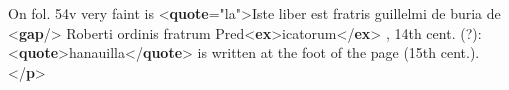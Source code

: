 \begin{shaded}
\hspace*{1em}\hspace*{1em}On fol. 54v very faint is {<\textbf{quote}\hspace*{1em}{xml:lang}="{la}">}Iste liber est fratris\mbox{}\newline 
\hspace*{1em}\hspace*{1em}\hspace*{1em}\hspace*{1em}\hspace*{1em}\hspace*{1em}\hspace*{1em}\hspace*{1em} guillelmi de buria de {<\textbf{gap}/>} Roberti ordinis fratrum\mbox{}\newline 
\hspace*{1em}\hspace*{1em}\hspace*{1em}\hspace*{1em}\hspace*{1em}\hspace*{1em}\hspace*{1em}\hspace*{1em} Pred{<\textbf{ex}>}icatorum{</\textbf{ex}>}\mbox{}\newline 
\hspace*{1em}\hspace*{1em}\hspace*{1em}, 14th cent. (?): {<\textbf{quote}>}hanauilla{</\textbf{quote}>} is\mbox{}\newline 
\hspace*{1em}\hspace*{1em}\hspace*{1em}\hspace*{1em}\hspace*{1em}\hspace*{1em} written at the foot of the page (15th cent.).{</\textbf{p}>}\mbox{}\newline 
\hspace*{1em}\mbox{}\newline 
\hspace*{1em}\mbox{}\newline 

\end{shaded}
